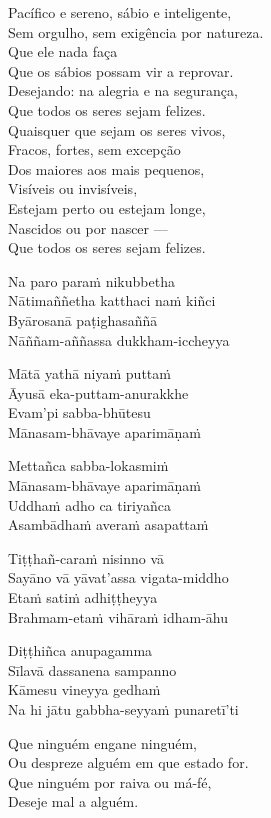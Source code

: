 Pacífico e sereno, sábio e inteligente,\\
Sem orgulho, sem exigência por natureza.\\
Que ele nada faça\\
Que os sábios possam vir a reprovar.\\
Desejando: na alegria e na segurança,\\
Que todos os seres sejam felizes.\\
Quaisquer que sejam os seres vivos,\\
Fracos, fortes, sem excepção\\
Dos maiores aos mais pequenos,\\
Visíveis ou invisíveis,\\
Estejam perto ou estejam longe,\\
Nascidos ou por nascer ---\\
Que todos os seres sejam felizes.

\clearpage

Na paro paraṁ nikubbetha\\
Nātimaññetha katthaci naṁ kiñci\\
Byārosanā paṭighasaññā\\
Nāññam-aññassa dukkham-iccheyya

Mātā yathā niyaṁ puttaṁ\\
Āyusā eka-puttam-anurakkhe\\
Evam'pi sabba-bhūtesu\\
Mānasam-bhāvaye aparimāṇaṁ

Mettañca sabba-lokasmiṁ\\
Mānasam-bhāvaye aparimāṇaṁ\\
Uddhaṁ adho ca tiriyañca\\
Asambādhaṁ averaṁ asapattaṁ

Tiṭṭhañ-caraṁ nisinno vā\\
Sayāno vā yāvat'assa vigata-middho\\
Etaṁ satiṁ adhiṭṭheyya\\
Brahmam-etaṁ vihāraṁ idham-āhu

Diṭṭhiñca anupagamma\\
Sīlavā dassanena sampanno\\
Kāmesu vineyya gedhaṁ\\
Na hi jātu gabbha-seyyaṁ punaretī'ti

\clearpage

Que ninguém engane ninguém,\\
Ou despreze alguém em que estado for.\\
Que ninguém por raiva ou má-fé,\\
Deseje mal a alguém.

